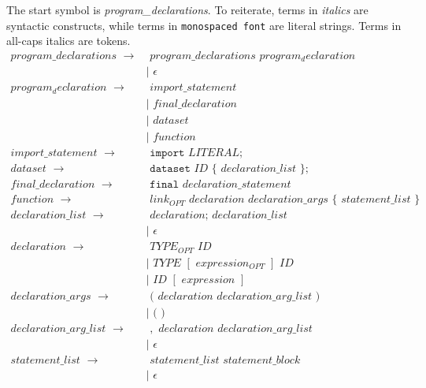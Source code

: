 \documentclass{article}
\newcommand{\code}{\texttt}
\begin{document}
The start symbol is \emph{program\_declarations}. To reiterate, terms in \emph{italics} are syntactic constructs, while terms in \code{monospaced font} are literal strings. Terms in all-caps italics are tokens.
\begin{align*}
program\_declarations\,\,\rightarrow&\,\,program\_declarations\,\,program_declaration\,\,\\
                    & |\,\,\epsilon\\
program_declaration\,\,\rightarrow&\,\,import\_statement\\
                    & |\,\,final\_declaration\\
                    & |\,\,dataset\\
                    & |\,\,function\\
import\_statement\,\,\rightarrow&\,\,\code{import}\,\,LITERAL\code{;}\\
dataset\,\,\rightarrow&\,\,\code{dataset}\,\,ID\,\,\code{\{}\,\,declaration\_list\,\,\code{\}}\code{;}\\
final\_declaration\,\,\rightarrow&\,\,\code{final}\,\,declaration\_statement\\
function\,\,\rightarrow&\,\,link_{OPT}\,\,declaration\,\,declaration\_args\,\,\code{\{}\,\,statement\_list\,\,\code{\}}\\
declaration\_list\,\,\rightarrow&\,\,declaration\code{;}\,\,declaration\_list\\
                    & |\,\,\epsilon\\
declaration\,\,\rightarrow&\,\,TYPE_{OPT}\,\,ID\\
                    & |\,\,TYPE\,\,[\,\,expression_{OPT}\,\,]\,\,ID\\
                    & |\,\,ID\,\,[\,\,expression\,\,]\\
declaration\_args\,\,\rightarrow&\,\,\code{(}\,\, declaration\,\,declaration\_arg\_list\,\,\code{)}\\
                    & |\,\,\code{(}\,\,\code{)}\\
declaration\_arg\_list\,\,\rightarrow&\,\,,\,\,declaration\,\,declaration\_arg\_list\\
                    & |\,\,\epsilon\\
statement\_list\,\,\rightarrow&\,\,statement\_list\,\,statement\_block\\
                    & |\,\,\epsilon
\end{align*}
\end{document}
